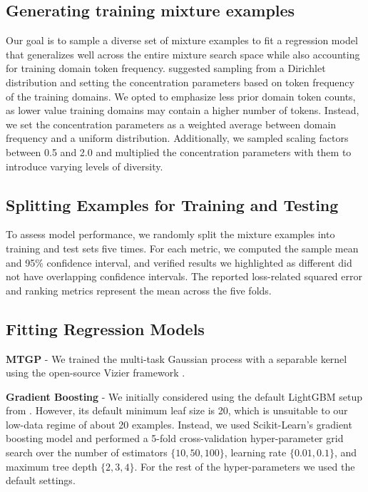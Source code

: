 \subsection{Generating training mixture examples}
\label{sec:generating_training_mixture_examples}
Our goal is to sample a diverse set of mixture examples to fit a regression model that generalizes well across the entire mixture search space while also accounting for training domain token frequency. \cite{regmix} suggested sampling from a Dirichlet distribution and setting the concentration parameters based on token frequency of the training domains. We opted to  emphasize less prior domain token counts, as lower value training domains may contain a higher number of tokens. Instead, we set the concentration parameters as a weighted average between domain frequency and a uniform distribution. Additionally, we sampled scaling factors between 0.5 and 2.0 and multiplied the concentration parameters with them to introduce varying levels of diversity. 


\subsection{Splitting Examples for Training and Testing}
To assess model performance, we randomly split the mixture examples into training and test sets five times. For each metric, we computed the sample mean and 95\% confidence interval, and verified results we highlighted as different did not have overlapping confidence intervals. The reported loss-related squared error and ranking metrics represent the mean across the five folds.

\subsection{Fitting Regression Models}
\label{ref:appendix_fitting_regression_models}

\noindent \textbf{MTGP} - We trained the multi-task Gaussian process with a separable kernel using the open-source Vizier framework \cite{vizier}.  

\noindent \textbf{Gradient Boosting} - We initially considered using the default LightGBM \cite{lightgbm} setup from \cite{regmix}. However, its default minimum leaf size is 20, which is unsuitable to our low-data regime of about 20 examples. Instead, we used Scikit-Learn's \cite{scikit-learn} gradient boosting model and performed a 5-fold cross-validation hyper-parameter grid search over the number of estimators \(\{10, 50, 100\}\), learning rate \(\{0.01, 0.1\}\), and maximum tree depth \(\{2, 3, 4\}\). For the rest of the  hyper-parameters we used the default settings.

